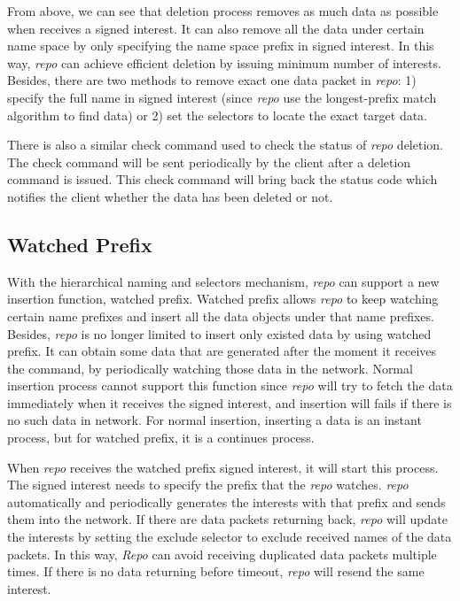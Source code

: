 \documentclass[conference]{IEEEtran}
\begin{document}
From above, we can see that deletion process removes as much data as possible when receives a signed interest. It can also remove all the data under certain name space by only specifying the name space prefix in signed interest. In this way, \emph{repo} can achieve efficient deletion by issuing minimum number of interests. Besides, there are two methods to remove exact one data packet in \emph{repo}: 1) specify the full name in signed interest (since \emph{repo} use the longest-prefix match algorithm to find data) or 2) set the selectors to locate the exact target data.

There is also a similar check command used to check the status of \emph{repo} deletion. The check command will be sent periodically by the client after a deletion command is issued. This check command will bring back the status code which notifies the client whether the data has been deleted or not.

\subsection{Watched Prefix}

With the hierarchical naming and selectors mechanism, \emph{repo} can support a new insertion function, watched prefix. Watched prefix allows \emph{repo} to keep watching certain name prefixes and insert all the data objects under that name prefixes. Besides, \emph{repo} is no longer limited to insert only existed data by using watched prefix. It can obtain some data that are generated after the moment it receives the command, by periodically watching those data in the network. Normal insertion process cannot support this function since \emph{repo} will try to fetch the data immediately when it receives the signed interest, and insertion will fails if there is no such data in network. For normal insertion, inserting a data is an instant process, but for watched prefix, it is a continues process.

When \emph{repo} receives the watched prefix signed interest, it will start this process. The signed interest needs to specify the prefix that the \emph{repo} watches. \emph{repo} automatically and periodically generates the interests with that prefix and sends them into the network. If there are data packets returning back, \emph{repo} will update the interests by setting the exclude selector to exclude received names of the data packets. In this way, \emph{Repo} can avoid receiving duplicated data packets multiple times. If there is no data returning before timeout, \emph{repo} will resend the same interest.
\end{document}
